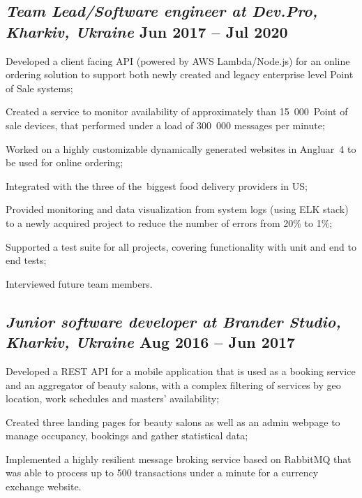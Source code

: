 \documentclass[a4paper,12pt]{book}
\begin{document}
\subsection{{\sl\bf\hspace{0.1in}Team Lead/Software engineer at Dev.Pro, Kharkiv, Ukraine} \hfill Jun 2017 -- Jul 2020}
\begin{zitemize}
 \item Developed a client facing API (powered by AWS Lambda/Node.js) for an online ordering solution to support both newly created and legacy enterprise level Point of Sale systems;
 \item Created a service to monitor availability of approximately than 15~000~Point of sale devices, that performed under a load of 300~000 messages per minute;
 \item Worked on a highly customizable dynamically generated websites in Angluar~4 to be used for online ordering;
 \item Integrated with the three of the~biggest food delivery providers in US;
 \item Provided monitoring and data visualization from system logs (using ELK stack) to a newly acquired project to reduce the number of errors from 20\% to 1\%;
 \item Supported a test suite for all projects, covering functionality with unit and end to end tests;
 \item Interviewed future team members.
\end{zitemize}

\subsection{{\sl\bf\hspace{0.1in} Junior software developer at Brander Studio, Kharkiv, Ukraine} \hfill Aug 2016 -- Jun 2017}
\begin{zitemize}
 \item Developed a REST API for a mobile application that is used as a booking service and an aggregator of beauty salons, with a complex filtering of services by geo location, work schedules and masters' availability;
 \item Created three landing pages for beauty salons as well as an admin webpage to manage occupancy, bookings and gather statistical data;
 \item Implemented a highly resilient message broking service based on RabbitMQ that was able to process up to 500 transactions under a minute for a currency exchange website.
\end{zitemize}
\end{document}
